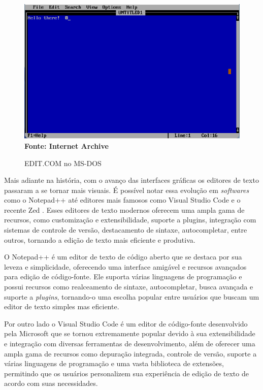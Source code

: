\FloatBarrier
\begin{figure}[!htbp]
    \centering
    \caption{EDIT.COM no MS-DOS}
    \includegraphics[scale=0.8]{imagens/EDIT_MSDOS.png}
    \\\textbf{Fonte: Internet Archive} \label{fig:EDIT_MSDOS}
\end{figure}
\FloatBarrier

Mais adiante na história, com o avanço das interfaces gráficas os editores de
texto passaram a se tornar mais visuais. É possível notar essa evolução em \textit{softwares}
como o Notepad++ \cite{NotepadPlusPlus2025} até editores mais famosos como
Visual Studio Code \cite{VSCode2025} e o recente Zed \cite{ZedEditor2025}. Esses
editores de texto modernos oferecem uma ampla gama de recursos, como
customização e extensibilidade, suporte a plugins, integração com sistemas de
controle de versão, destacamento de sintaxe, autocompletar, entre outros,
tornando a edição de texto mais eficiente e produtiva.

O Notepad++ é um editor de texto de código aberto que se destaca por sua leveza
e simplicidade, oferecendo uma interface amigável e recursos avançados para edição
de código-fonte. Ele suporta várias linguagens de programação e possui recursos
como realceamento de sintaxe, autocompletar, busca avançada e suporte a \textit{plugins},
tornando-o uma escolha popular entre usuários que buscam um editor de texto
simples mas eficiente.

Por outro lado o Visual Studio Code é um editor de código-fonte desenvolvido
pela Microsoft que se tornou extremamente popular devido à sua extensibilidade e
integração com diversas ferramentas de desenvolvimento, além de oferecer uma ampla
gama de recursos como depuração integrada, controle de versão, suporte a várias linguagens
de programação e uma vasta biblioteca de extensões, permitindo que os usuários
personalizem sua experiência de edição de texto de acordo com suas necessidades.

